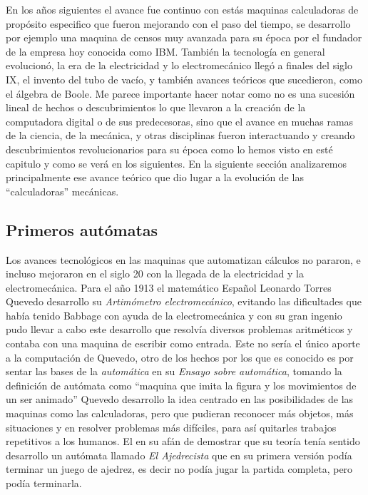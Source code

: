 \documentclass[letterpaper,12pt,oneside]{book}
\begin{document}
		En los años siguientes el avance fue continuo con estás maquinas calculadoras de propósito especifico que fueron mejorando con el paso del tiempo, se desarrollo
		por ejemplo una maquina de censos muy avanzada para su época por el fundador de la empresa hoy conocida como IBM. También la tecnología en general evolucionó,
		la era de la electricidad y lo electromecánico llegó a finales del siglo IX, el invento del tubo de vacío, y también
		avances teóricos que sucedieron, como el álgebra de Boole. Me parece importante hacer notar como no es una sucesión lineal de hechos o descubrimientos
		lo que llevaron a la creación de la computadora digital o de sus predecesoras, sino que el avance en muchas ramas de la ciencia, de la mecánica, y otras
		disciplinas fueron interactuando y creando descubrimientos revolucionarios para su época como lo hemos visto en esté capitulo y como
		se verá en los siguientes. En la siguiente sección analizaremos principalmente ese avance teórico que dio lugar a la evolución de las ``calculadoras'' mecánicas.
		

		\clearpage		
		
		\subsection{Primeros autómatas}
		
		Los avances tecnológicos en las maquinas que automatizan cálculos no pararon, e incluso mejoraron en el siglo 20 con la llegada de la electricidad
		y la electromecánica. Para el año 1913 el matemático Español Leonardo Torres Quevedo desarrollo su \textit{Artimómetro electromecánico}, evitando las
		dificultades que había tenido Babbage con ayuda de la electromecánica y con su gran ingenio pudo llevar a cabo este desarrollo que resolvía diversos
		problemas aritméticos y contaba con una maquina de escribir como entrada. Este no sería el único aporte
		a la computación de Quevedo, otro de los hechos por los que es conocido es por sentar las bases de la \textit{automática} en su \textit{Ensayo sobre automática}, 
		tomando
		la definición de autómata como ``maquina que imita la figura y los movimientos de un ser animado'' Quevedo desarrollo la idea centrado en las posibilidades
		de las maquinas como las calculadoras, pero que pudieran reconocer más objetos, más situaciones y en resolver problemas más difíciles, para así
		quitarles trabajos repetitivos a los humanos. El en su afán de demostrar que su teoría tenía sentido desarrollo un autómata llamado
		\textit{El Ajedrecista} que en su primera versión podía terminar un juego de ajedrez, es decir no podía jugar la partida completa,
		pero podía terminarla\cite{museo_torres_quevedo_ajedrecista_nodate,ifrah_universal_2001}.
		
\end{document}
